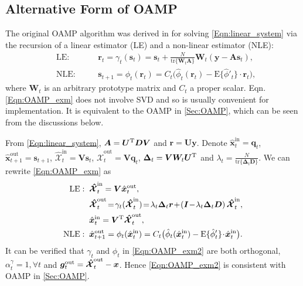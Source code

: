 \documentclass[journal]{IEEEtran}
\newcommand{\mr}{\mathrm}
\newcommand{\BS}{\begin{subequations}}
\newcommand{\ES}{\end{subequations}}
\renewcommand{\bf}{\bm}
\begin{document}
\subsection{Alternative Form of OAMP}
The original OAMP algorithm was derived in \cite{Ma2016} for solving \eqref{Eqn:linear_system} via the recursion of a linear estimator (LE) and a non-linear estimator (NLE): 
\BS\label{Eqn:OAMP_exm}\begin{alignat}{2}
& \mr{LE:} & \quad& \bf{{r}}_t={\gamma}_t(\bf{{s}}_t)=\bf{{s}}_t+ \tfrac{N}{\mr{tr}\{\bf{{W}}_t\bf{A}\}}{\bf{W}}_t(\bf{y}-\bf{A}\bf{{s}}_t), \label{Eqn:OAMP_exma}\\
& \mr{NLE:} & & \bf{{s}}_{t+1}= \phi_t(\bf{{r}}_t)= C_t\big(\hat{\phi}_t(\bf{{r}}_t)-  \mr{E}\{\hat{ {\phi}}'_t\}\cdot \bf{{r}}_t\big), \label{Eqn:OAMP_exmb}
\end{alignat}\ES	
where  $\bf{{W}}_{\!t}$ is an arbitrary prototype matrix and $C_t$ a proper scalar. Eqn. \eqref{Eqn:OAMP_exm} does not involve SVD and so is usually convenient for implementation. It is equivalent to the OAMP in \ref{Sec:OAMP}, which can be seen from  the discussions below. 

From \eqref{Eqn:linear_system},  $\bf{A}=\bf{U}^{\rm T}\bf{DV}$ and $\bf{r}=\bf{U}\bf{y}$. Denote  $\hat{\bf{x}}_{t}^{\mr{in}}=\bf{q}_t$,  $\hat{\bf{x}}_{t+1}^{\mr{out}}=\bf{s}_{t+1}$,  $\hat{\bf{\mathcal{X}}}_{t}^{\mr{in}}=\bf{V}\bf{s}_t$,  $\hat{\bf{\mathcal{X}}}_{t}^{\mr{out}}=\bf{V}\bf{q}_t$,  $\bf{\Delta}_t=\bf{VW}_t\bf{U}^{\rm T}$ and $\lambda_t=\frac{N}{\mr{tr}\{\bf{\Delta}_t\bf{D}\}}$. We can rewrite \eqref{Eqn:OAMP_exm} as 
\BS\label{Eqn:OAMP_exm2}\begin{align}
\mr{LE:}  \; \; & \bf{\mathcal{\hat{X}}}_{t}^{\mr{in}}=\bf{V}\hat{\bf{x}}^{\mr{out}}_t,\\
& \bf{\mathcal{\hat{X}}}_{t}^{\mr{out}}\!=\!\gamma_t( \bf{\mathcal{\hat{X}}}_{t}^{\mr{in}})\!=\!\lambda_t\bf{\Delta}_t\bf{r} \!+\! \left(\bf{I} \!-\!\lambda_t\bf{\Delta}_t\bf{D} \right) \bf{\mathcal{\hat{X}}}_{t}^{\mr{in}},\\  
&\hat{\bf{x}}^{\mr{in}}_t=\bf{V}^{\rm T}\bf{\mathcal{\hat{X}}}_{t}^{\mr{out}},\\
\mr{NLE:} \;\;& \hat{\bf{x}}^{\mr{out}}_{t+1}= \phi_t(\hat{\bf{x}}^{\mr{in}}_t)= C_t\big(\hat{\phi}_t(\hat{\bf{x}}^{\mr{in}}_t)- \mr{E}\{\hat{\phi}'_t\}\!\cdot\! \hat{\bf{x}}^{\mr{in}}_t\big).
\end{align}\ES	
It can be verified that $\gamma_t$ and $\phi_t$ in \eqref{Eqn:OAMP_exm2} are both orthogonal, $\alpha_t^\gamma=1, \forall t$ and $\bf{g}_t^{\rm out}= \bf{\mathcal{\hat{X}}}_{t}^{\mr{out}}-\bf{x}$. Hence  \eqref{Eqn:OAMP_exm2} is consistent with OAMP in \ref{Sec:OAMP}. 
\end{document}
